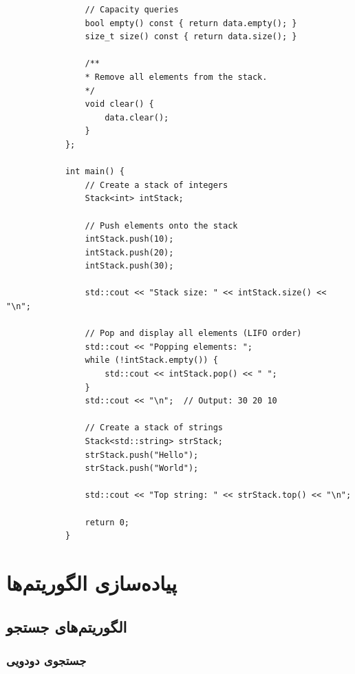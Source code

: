 \documentclass{matinbook}
\begin{document}
\begin{latin}
\begin{verbatim}
                // Capacity queries
                bool empty() const { return data.empty(); }
                size_t size() const { return data.size(); }
                
                /**
                * Remove all elements from the stack.
                */
                void clear() {
                    data.clear();
                }
            };
            
            int main() {
                // Create a stack of integers
                Stack<int> intStack;
                
                // Push elements onto the stack
                intStack.push(10);
                intStack.push(20);
                intStack.push(30);
                
                std::cout << "Stack size: " << intStack.size() << "\n";
                
                // Pop and display all elements (LIFO order)
                std::cout << "Popping elements: ";
                while (!intStack.empty()) {
                    std::cout << intStack.pop() << " ";
                }
                std::cout << "\n";  // Output: 30 20 10
                
                // Create a stack of strings
                Stack<std::string> strStack;
                strStack.push("Hello");
                strStack.push("World");
                
                std::cout << "Top string: " << strStack.top() << "\n";
                
                return 0;
            }
        \end{verbatim}
    \end{latin}
    \label{code:templates}
    
    \chapter{پیاده‌سازی الگوریتم‌ها}
    
    \section{الگوریتم‌های جستجو}
    
    \subsection{جستجوی دودویی}
    
\end{document}
